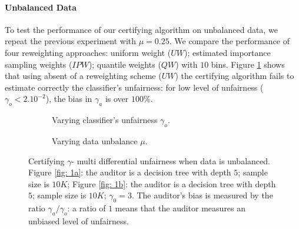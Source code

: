 \documentclass{article}
\begin{document}
\paragraph{Unbalanced Data}
To test the performance of our certifying algorithm on unbalanced data, we repeat the previous experiment with $\mu=0.25$. We compare the performance of four reweighting approaches: uniform weight ($UW$); estimated importance sampling weights ($IPW$); quantile weights ($QW$) with $10$ bins. Figure \ref{fig: 2a} shows that using absent of a reweighting scheme ($UW$) the certifying algorithm fails to estimate correctly the classifier's unfairness: for low level of unfairness ($\gamma_{o} < 2. 10^{-2}$), the bias in $\gamma_{a}$ is over $100\%$. 


\begin{figure}[h!]
\begin{subfigure} {.475\linewidth}
\centering
{}
\caption{Varying classifier's unfairness $\gamma_{o}$.}
\label{fig: 2a}
\end{subfigure}
 \hfill%
\begin{subfigure} {.475\linewidth}
\centering
{}
\caption{Varying data unbalance $\mu$.}
\label{fig: 2b}
\end{subfigure}
\caption{Certifying $\gamma$- multi differential unfairness when data is unbalanced. Figure \ref{fig: 1a}: the auditor is a decision tree with depth $5$; sample size is $10K$; Figure \ref{fig: 1b}: the auditor is a decision tree with depth $5$; sample size is $10K$; $\gamma_{0}=3$. The auditor's bias is measured by the ratio $\gamma_{a}/\gamma_{o}$: a ratio of $1$ means that the auditor measures an unbiased level of unfairness.} 
\end{figure}
\end{document}
